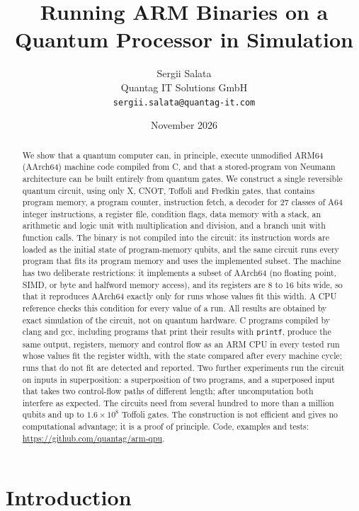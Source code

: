 \documentclass[11pt]{article}
\title{Running ARM Binaries on a Quantum Processor in Simulation}
\author{Sergii Salata\\ Quantag IT Solutions GmbH\\ \texttt{sergii.salata@quantag-it.com}}
\date{November 2026}
\begin{document}
\maketitle

\begin{abstract}
We show that a quantum computer can, in principle, execute unmodified ARM64 (AArch64) machine code
compiled from C, and that a stored-program von Neumann architecture can be built entirely from
quantum gates. We construct a single reversible quantum circuit, using only X, CNOT, Toffoli and
Fredkin gates, that contains program memory, a program counter, instruction fetch, a decoder for
27 classes of A64 integer instructions, a register file, condition flags, data memory with a
stack, an arithmetic and logic unit with multiplication and division, and a branch unit with
function calls. The binary is not compiled into the circuit: its instruction words are loaded
as the initial state of program-memory qubits, and the same circuit runs every program that fits
its program memory and uses the implemented subset. The machine has two deliberate restrictions:
it implements a subset of AArch64 (no floating point, SIMD, or byte and halfword memory access),
and its registers are 8 to 16 bits wide, so that it reproduces AArch64 exactly only for runs whose
values fit this width. A CPU reference checks this condition for every value of a run. All results
are obtained by exact simulation of the circuit, not on quantum hardware. C programs compiled by
clang and gcc, including programs that print their results with \texttt{printf}, produce the same
output, registers, memory and control flow as an ARM CPU in every tested run whose values fit the
register width, with the state compared after every machine cycle; runs that do not fit are detected
and reported. Two further experiments run the circuit on inputs in
superposition: a superposition of two programs, and a superposed input that takes two control-flow
paths of different length; after uncomputation both interfere as expected. The circuits need from
several hundred to more than a million qubits and up to $1.6\times10^{8}$ Toffoli gates. The
construction is not efficient and gives no computational advantage; it is a proof of principle.
Code, examples and tests: \url{https://github.com/quantag/arm-qpu}.
\end{abstract}

\section{Introduction}
\end{document}
